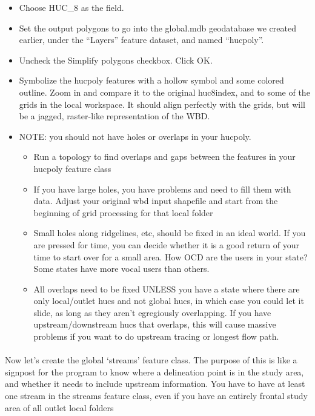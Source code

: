 \documentclass[letterpaper,10pt,english]{sphinxmanual}
\begin{document}
\begin{itemize}
\begin{itemize}
\item {} 
Choose HUC\_8 as the field.

\item {} 
Set the output polygons to go into the global.mdb geodatabase we created earlier, under the “Layers” feature dataset, and named “hucpoly”.

\item {} 
Uncheck the Simplify polygons checkbox. Click OK.

\item {} 
Symbolize the hucpoly features with a hollow symbol and some colored outline. Zoom in and compare it to the original huc8index, and to some of the grids in the local workspace. It should align perfectly with the grids, but will be a jagged, raster-like representation of the WBD.

\item {} 
NOTE: you should not have holes or overlaps in your hucpoly.
\begin{itemize}
\item {} 
Run a topology to find overlaps and gaps between the features in your hucpoly feature class

\item {} 
If you have large holes, you have problems and need to fill them with data. Adjust your original wbd input shapefile and start from the beginning of grid processing for that local folder

\item {} 
Small holes along ridgelines, etc, should be fixed in an ideal world. If you are pressed for time, you can decide whether it is a good return of your time to start over for a small area. How OCD are the users in your state? Some states have more vocal users than others.

\item {} 
All overlaps need to be fixed UNLESS you have a state where there are only local/outlet hucs and not global hucs, in which case you could let it slide, as long as they aren’t egregiously overlapping.  If you have upstream/downstream hucs that overlaps, this will cause massive problems if you want to do upstream tracing or longest flow path.

\end{itemize}

\end{itemize}

\end{itemize}


\paragraph{}
\label{\detokenize{ex_2:global-streams}}
Now let’s create the global ‘streams’ feature class. The purpose of this is like a signpost for the program to know where a delineation point is in the study area, and whether it needs to include upstream information. You have to have at least one stream in the streams feature class, even if you have an entirely frontal study area of all outlet local folders
\end{document}

